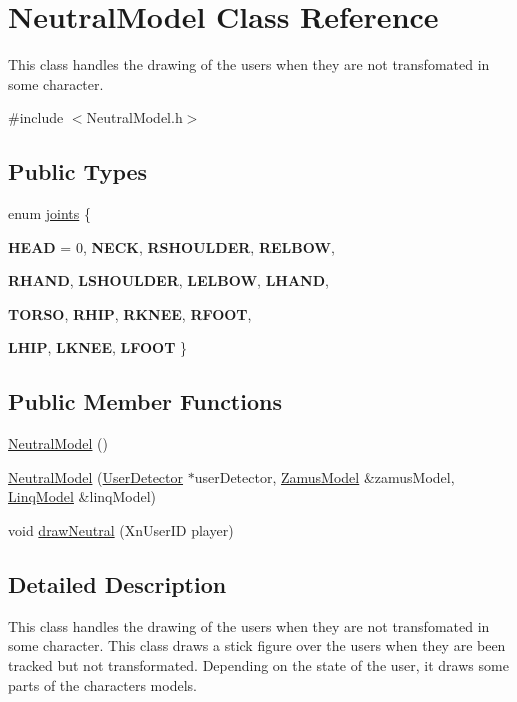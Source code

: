 \hypertarget{classNeutralModel}{
\section{NeutralModel Class Reference}
\label{classNeutralModel}
}


This class handles the drawing of the users when they are not transfomated in some character.  




{\ttfamily \#include $<$NeutralModel.h$>$}

\subsection*{Public Types}
\begin{DoxyCompactItemize}
\item 
enum \hyperlink{classNeutralModel_ae6dcf993ce557c9d12b4f647a9315402}{joints} \{ \par
{\bfseries HEAD} =  0, 
{\bfseries NECK}, 
{\bfseries RSHOULDER}, 
{\bfseries RELBOW}, 
\par
{\bfseries RHAND}, 
{\bfseries LSHOULDER}, 
{\bfseries LELBOW}, 
{\bfseries LHAND}, 
\par
{\bfseries TORSO}, 
{\bfseries RHIP}, 
{\bfseries RKNEE}, 
{\bfseries RFOOT}, 
\par
{\bfseries LHIP}, 
{\bfseries LKNEE}, 
{\bfseries LFOOT}
 \}
\end{DoxyCompactItemize}
\subsection*{Public Member Functions}
\begin{DoxyCompactItemize}
\item 
\hyperlink{classNeutralModel_acc468e49cc6ccad440a869d3e3dfbef9}{NeutralModel} ()
\item 
\hyperlink{classNeutralModel_a4de591c21128f7fe002aae39d38e2aaf}{NeutralModel} (\hyperlink{classUserDetector}{UserDetector} $\ast$userDetector, \hyperlink{classZamusModel}{ZamusModel} \&zamusModel, \hyperlink{classLinqModel}{LinqModel} \&linqModel)
\item 
void \hyperlink{classNeutralModel_a5a43982c4fa91e7a0751307b190b9900}{drawNeutral} (XnUserID player)
\end{DoxyCompactItemize}


\subsection{Detailed Description}
This class handles the drawing of the users when they are not transfomated in some character. This class draws a stick figure over the users when they are been tracked but not transformated. Depending on the state of the user, it draws some parts of the characters models.


